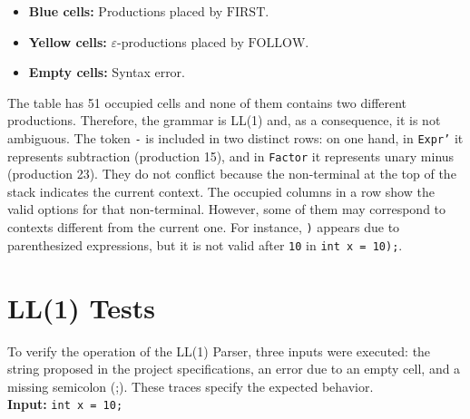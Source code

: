 \documentclass[12pt,letterpaper]{article}
\begin{document}
\begin{itemize}
    \item \textbf{Blue cells:} Productions placed by $\text{FIRST}$.
    \item \textbf{Yellow cells:} $\varepsilon$-productions placed by $\text{FOLLOW}$.
    \item \textbf{Empty cells:} Syntax error.
\end{itemize}

The table has 51 occupied cells and none of them contains two different productions. Therefore, the grammar is LL(1) and, as a consequence, it is not ambiguous. The token \texttt{-} is included in two distinct rows: on one hand, in \texttt{Expr'} it represents subtraction (production 15), and in \texttt{Factor} it represents unary minus (production 23). They do not conflict because the non-terminal at the top of the stack indicates the current context. The occupied columns in a row show the valid options for that non-terminal. However, some of them may correspond to contexts different from the current one. For instance, \texttt{)} appears due to parenthesized expressions, but it is not valid after \texttt{10} in \texttt{int x = 10);}.

\section{LL(1) Tests}
To verify the operation of the LL(1) Parser, three inputs were executed: the string proposed in the project specifications, an error due to an empty cell, and a missing semicolon (;). These traces specify the expected behavior.\\

\textbf{Input:} \texttt{int x = 10;}
\end{document}
